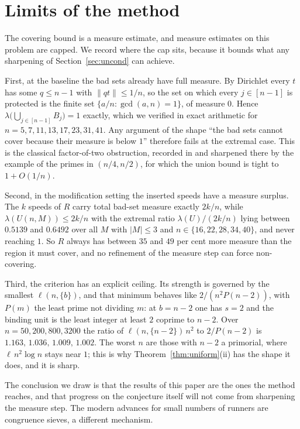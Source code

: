 \documentclass[11pt]{amsart}
\theoremstyle{plain}
\theoremstyle{definition}
\newcommand{\nrm}[1]{\left\lVert #1 \right\rVert}
\begin{document}
\section{Limits of the method}\label{sec:limits}

The covering bound is a measure estimate, and measure estimates on this problem are capped. We
record where the cap sits, because it bounds what any sharpening of Section~\ref{sec:uncond} can
achieve.

First, at the baseline the bad sets already have full measure. By Dirichlet every $t$ has some
$q\le n-1$ with $\nrm{qt}\le1/n$, so the set on which every $j\in[n-1]$ is protected is the finite
set $\{a/n:\gcd(a,n)=1\}$, of measure $0$. Hence $\lambda\bigl(\bigcup_{j\in[n-1]}B_j\bigr)=1$
exactly, which we verified in exact arithmetic for $n=5,7,11,13,17,23,31,41$. Any argument of the
shape ``the bad sets cannot cover because their measure is below $1$'' therefore fails at the
extremal case. This is the classical factor-of-two obstruction, recorded in \cite[Prop.~1.1]{tao}
and sharpened there by the example of the primes in $(n/4,n/2)$, for which the union bound is tight
to $1+O(1/n)$.

Second, in the modification setting the inserted speeds have a measure surplus. The $k$ speeds of
$R$ carry total bad-set measure exactly $2k/n$, while $\lambda(U(n,M))\le2k/n$ with the extremal
ratio $\lambda(U)\big/(2k/n)$ lying between $0.5139$ and $0.6492$ over all $M$ with $|M|\le3$ and
$n\in\{16,22,28,34,40\}$, and never reaching $1$. So $R$ always has between $35$ and $49$ per cent
more measure than the region it must cover, and no refinement of the measure step can force
non-covering.

Third, the criterion has an explicit ceiling. Its strength is governed by the smallest
$\ell(n,\{b\})$, and that minimum behaves like $2/(n^{2}P(n-2))$, with $P(m)$ the least prime not
dividing $m$: at $b=n-2$ one has $s=2$ and the binding unit is the least integer at least $2$
coprime to $n-2$. Over $n=50,200,800,3200$ the ratio of $\ell(n,\{n-2\})\,n^{2}$ to $2/P(n-2)$ is
$1.163,\,1.036,\,1.009,\,1.002$. The worst $n$ are those with $n-2$ a primorial, where
$\ell\,n^{2}\log n$ stays near $1$; this is why Theorem~\ref{thm:uniform}(ii) has the shape it does,
and it is sharp.

The conclusion we draw is that the results of this paper are the ones the method reaches, and that
progress on the conjecture itself will not come from sharpening the measure step. The modern
advances for small numbers of runners \cite{bs,rosenfeld,trak,st} are congruence sieves, a different
mechanism.
\end{document}
